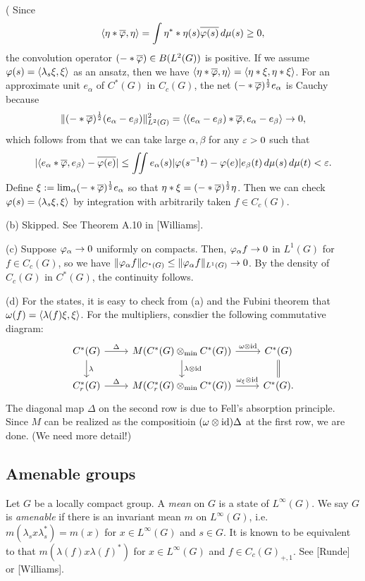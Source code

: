\documentclass{../../small}
\begin{document}
\begin{pf}
(
Since
\[\langle\eta*\overline{\varphi},\eta\rangle=\int\eta^**\eta(s)\overline{\varphi(s)}\,d\mu(s)\ge0,\]
the convolution operator $(-*\overline{\varphi})\in B(L^2(G))$ is positive.
If we assume $\varphi(s)=\langle\lambda_s\xi,\xi\rangle$ as an ansatz, then we have $\langle\eta*\overline{\varphi},\eta\rangle=\langle\eta*\xi,\eta*\xi\rangle$.
For an approximate unit $e_\alpha$ of $C^*(G)$ in $C_c(G)$, the net $(-*\overline{\varphi})^{\frac12}e_\alpha$ is Cauchy because
\[\|(-*\overline{\varphi})^{\frac12}(e_\alpha-e_\beta)\|_{L^2(G)}^2=\langle(e_\alpha-e_\beta)*\overline{\varphi},e_\alpha-e_\beta\rangle\to0,\]
which follows from that we can take large $\alpha,\beta$ for any $\varepsilon>0$ such that
\[|\langle e_\alpha*\overline{\varphi},e_\beta\rangle-\overline{\varphi(e)}|\le\iint e_\alpha(s)|\varphi(s^{-1}t)-\varphi(e)|e_\beta(t)\,d\mu(s)\,d\mu(t)<\varepsilon.\]
Define $\xi:=\lim_\alpha(-*\overline{\varphi})^{\frac12}e_\alpha$ so that $\eta*\xi=(-*\overline{\varphi})^{\frac12}\eta$.
Then we can check $\varphi(s)=\langle\lambda_s\xi,\xi\rangle$ by integration with arbitrarily taken $f\in C_c(G)$.

(b)
Skipped.
See Theorem A.10 in [Williams].

(c)
Suppose $\varphi_\alpha\to0$ uniformly on compacts.
Then, $\varphi_\alpha f\to0$ in $L^1(G)$ for $f\in C_c(G)$, so we have $\|\varphi_\alpha f\|_{C^*(G)}\le\|\varphi_\alpha f\|_{L^1(G)}\to0$.
By the density of $C_c(G)$ in $C^*(G)$, the continuity follows.

(d)
For the states, it is easy to check from (a) and the Fubini theorem that $\omega(f)=\langle\lambda(f)\xi,\xi\rangle$.
For the multipliers, consdier the following commutative diagram:
\[\begin{tikzcd}
C^*(G) \ar{r}{\Delta}\ar{d}{\lambda} & M(C^*(G)\otimes_{\min}C^*(G)) \ar{r}{\omega\otimes\id}\ar{d}{\lambda\otimes\id} & C^*(G) \ar[equals]{d}\\
C_r^*(G) \ar{r}{\Delta} & M(C_r^*(G)\otimes_{\min}C^*(G)) \ar{r}{\omega_\xi\otimes\id} & C^*(G).
\end{tikzcd}\]
The diagonal map $\Delta$ on the second row is due to Fell's absorption principle.
Since $M$ can be realized as the compositioin $(\omega\otimes\operatorname{id})\Delta$ at the first row, we are done. (We need more detail!)
\end{pf}



\subsection{Amenable groups}
\begin{defn}
Let $G$ be a locally compact group.
A \emph{mean} on $G$ is a state of $L^\infty(G)$.
We say $G$ is \emph{amenable} if there is an invariant mean $m$ on $L^\infty(G)$, i.e.~$m(\lambda_sx\lambda_s^*)=m(x)$ for $x\in L^\infty(G)$ and $s\in G$.
It is known to be equivalent to that $m(\lambda(f)x\lambda(f)^*)$ for $x\in L^\infty(G)$ and $f\in C_c(G)_{+,1}$.
See [Runde] or [Williams].
\end{defn}
\end{document}
